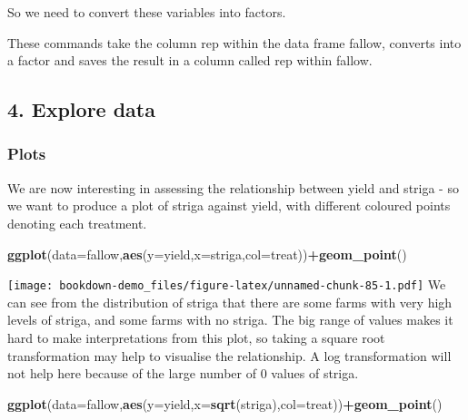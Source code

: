 \documentclass[]{book}
\newenvironment{Shaded}{\begin{snugshade}}{\end{snugshade}}
\newcommand{\KeywordTok}[1]{\textcolor[rgb]{0.13,0.29,0.53}{\textbf{#1}}}
\newcommand{\DataTypeTok}[1]{\textcolor[rgb]{0.13,0.29,0.53}{#1}}
\newcommand{\OperatorTok}[1]{\textcolor[rgb]{0.81,0.36,0.00}{\textbf{#1}}}
\newcommand{\NormalTok}[1]{#1}
\theoremstyle{definition}
\theoremstyle{definition}
\theoremstyle{definition}
\theoremstyle{remark}
\begin{document}
So we need to convert these variables into factors.

\begin{Shaded}
\end{Shaded}

These commands take the column rep within the data frame fallow,
converts into a factor and saves the result in a column called rep
within fallow.

\subsection{4. Explore data}\label{explore-data-2}

\subsubsection{Plots}\label{plots-2}

We are now interesting in assessing the relationship between yield and
striga - so we want to produce a plot of striga against yield, with
different coloured points denoting each treatment.

\begin{Shaded}
\begin{Highlighting}[]
\KeywordTok{ggplot}\NormalTok{(}\DataTypeTok{data=}\NormalTok{fallow,}\KeywordTok{aes}\NormalTok{(}\DataTypeTok{y=}\NormalTok{yield,}\DataTypeTok{x=}\NormalTok{striga,}\DataTypeTok{col=}\NormalTok{treat))}\OperatorTok{+}\KeywordTok{geom_point}\NormalTok{()}
\end{Highlighting}
\end{Shaded}

\texttt{[image: bookdown-demo\_files/figure-latex/unnamed-chunk-85-1.pdf]}
We can see from the distribution of striga that there are some farms
with very high levels of striga, and some farms with no striga. The big
range of values makes it hard to make interpretations from this plot, so
taking a square root transformation may help to visualise the
relationship. A log transformation will not help here because of the
large number of 0 values of striga.

\begin{Shaded}
\begin{Highlighting}[]
\KeywordTok{ggplot}\NormalTok{(}\DataTypeTok{data=}\NormalTok{fallow,}\KeywordTok{aes}\NormalTok{(}\DataTypeTok{y=}\NormalTok{yield,}\DataTypeTok{x=}\KeywordTok{sqrt}\NormalTok{(striga),}\DataTypeTok{col=}\NormalTok{treat))}\OperatorTok{+}\KeywordTok{geom_point}\NormalTok{()}
\end{Highlighting}
\end{Shaded}
\end{document}

